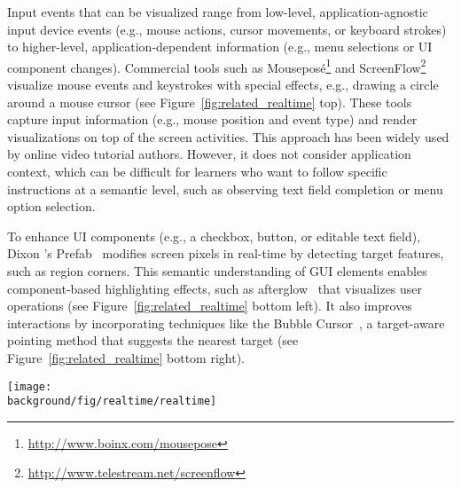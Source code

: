 Input events that can be visualized range from low-level, application-agnostic input device events (e.g., mouse actions, cursor movements, or keyboard strokes) to higher-level, application-dependent information (e.g., menu selections or UI component changes).
%
Commercial tools such as Mouseposé\footnote{\url{http://www.boinx.com/mousepose}} and ScreenFlow\footnote{\url{http://www.telestream.net/screenflow}} visualize mouse events and keystrokes with special effects, e.g., drawing a circle around a mouse cursor (see Figure~\ref{fig:related_realtime} top). These tools capture input information (e.g., mouse position and event type) and render visualizations on top of the screen activities. This approach has been widely used by online video tutorial authors. However, it does not consider application context, which can be difficult for learners who want to follow specific instructions at a semantic level, such as observing text field completion or menu option selection.

To enhance UI components (e.g., a checkbox, button, or editable text field), Dixon \ea{}'s Prefab~\cite{Dixon:2010fb,Dixon:2011:CHP:1978942.1979086} modifies screen pixels in real-time by detecting target features, such as region corners. This semantic understanding of GUI elements enables component-based highlighting effects, such as afterglow~\cite{Baudisch:2006:PET:1166253.1166280} that visualizes user operations (see Figure~\ref{fig:related_realtime} bottom left). It also improves interactions by incorporating techniques like the Bubble Cursor~\cite{Grossman:2005:BCE:1054972.1055012}, a target-aware pointing method that suggests the nearest target (see Figure~\ref{fig:related_realtime} bottom right).

\begin{figure*}[t!]
  \centering
  \texttt{[image: \\background/fig/realtime/realtime]}
  \caption{Real-time visual enhancements to GUI applications. The top row shows how Mouseposé highlights a mouse cursor (left) and displays keyboard input (right); The bottom row shows how Prefab~\cite{Dixon:2010fb} can enable visualizations and UI enhancements such as target-agnostic afterglow effects~\cite{Baudisch:2006:PET:1166253.1166280} (left) and target-aware cursor effects~\cite{Grossman:2005:BCE:1054972.1055012} (right) by identifying and reverse engineering UI components.}
  \label{fig:related_realtime}
\end{figure*}

